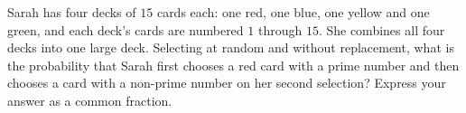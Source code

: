 Sarah has four decks of $15$ cards each: one red, one blue, one yellow and one green, and each deck's cards are numbered $1$ through $15$. She combines all four decks into one large deck. Selecting at random and without replacement, what is the probability that Sarah first chooses a red card with a prime number and then chooses a card with a non-prime number on her second selection? Express your answer as a common fraction.
